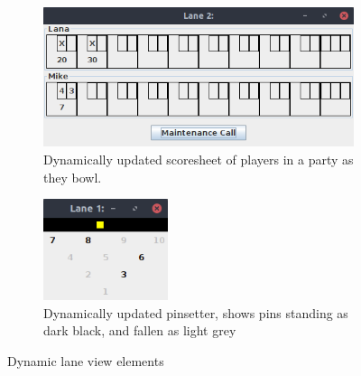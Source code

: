 \begin{figure}[H]
    \centering
    \begin{subfigure}{\textwidth}
        \includegraphics[width = \textwidth]{img/lanestatus.png}
        \caption{Dynamically updated scoresheet of players in a party as they bowl.}
    \end{subfigure}
    \begin{subfigure}{\textwidth}
        \centering
        \includegraphics[width = 0.4\textwidth]{img/pinsetter.png}
        \caption{Dynamically updated pinsetter, shows pins standing as dark black, and fallen as light grey}
    \end{subfigure}
    \caption{Dynamic lane view elements}
\end{figure}

